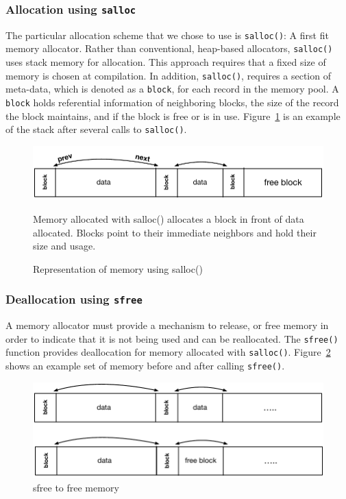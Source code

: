 \subsubsection{Allocation using \texttt{salloc}}

The particular allocation scheme that we chose to use is \texttt{salloc()}: A first fit memory allocator. Rather than conventional, heap-based allocators, \texttt{salloc()} uses stack memory for allocation. This approach requires that a fixed size of memory is chosen at compilation. In addition, \texttt{salloc()}, requires a section of meta-data, which is denoted as a \texttt{block}, for each record in the memory pool. A \texttt{block} holds referential information of neighboring blocks, the size of the record the block maintains, and if the block is free or is in use. Figure~\ref{fig:stack} is an example of the stack after several calls to \texttt{salloc()}.

\begin{figure}[!htb]
\includegraphics[scale=.55]{figs/stack.pdf}
\caption{Representation of memory using salloc()}
Memory allocated with salloc() allocates a block in front of data allocated. Blocks point to their immediate neighbors and hold their size and usage.
\label{fig:stack}
\end{figure}

\subsubsection{Deallocation using \texttt{sfree}}

A memory allocator must provide a mechanism to release, or free memory in order to indicate that it is not being used and can be reallocated. The \texttt{sfree()} function provides deallocation for memory allocated with \texttt{salloc()}. Figure~\ref{fig:free} shows an example set of memory before and after calling \texttt{sfree()}. 

\begin{figure}[!htb]
\includegraphics[scale=.55]{figs/sfree.pdf}
\caption{sfree to free memory}
\label{fig:free}
\end{figure}


